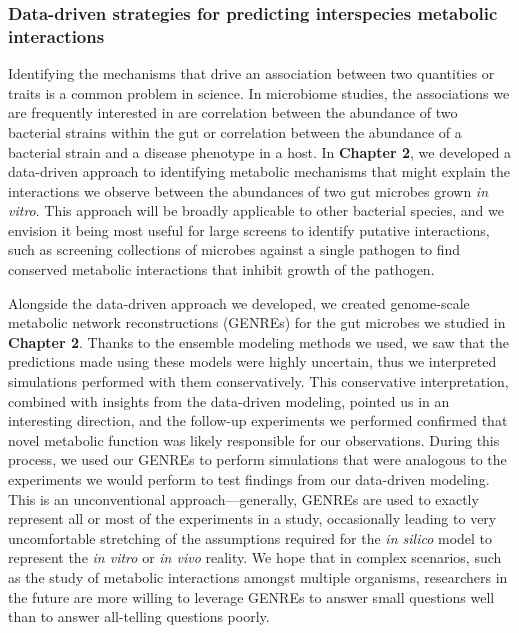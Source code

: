 \documentclass[11pt,twocolumn,notitlepage,openany,twoside]{book}
\begin{document}
\begin{refsection}
\subsubsection{Data-driven strategies for predicting interspecies metabolic interactions}

Identifying the mechanisms that drive an association between two quantities or traits is a common problem in science. In microbiome studies, the associations we are frequently interested in are correlation between the abundance of two bacterial strains within the gut or correlation between the abundance of a bacterial strain and a disease phenotype in a host. In \textbf{Chapter 2}, we developed a data-driven approach to identifying metabolic mechanisms that might explain the interactions we observe between the abundances of two gut microbes grown \textit{in vitro}. This approach will be broadly applicable to other bacterial species, and we envision it being most useful for large screens to identify putative interactions, such as screening collections of microbes against a single pathogen to find conserved metabolic interactions that inhibit growth of the pathogen.

Alongside the data-driven approach we developed, we created genome-scale metabolic network reconstructions (GENREs) for the gut microbes we studied in \textbf{Chapter 2}. Thanks to the ensemble modeling methods we used, we saw that the predictions made using these models were highly uncertain, thus we interpreted simulations performed with them conservatively. This conservative interpretation, combined with insights from the data-driven modeling, pointed us in an interesting direction, and the follow-up experiments we performed confirmed that novel metabolic function was likely responsible for our observations. During this process, we used our GENREs to perform simulations that were analogous to the experiments we would perform to test findings from our data-driven modeling. This is an unconventional approach---generally, GENREs are used to exactly represent all or most of the experiments in a study, occasionally leading to very uncomfortable stretching of the assumptions required for the \textit{in silico} model to represent the \textit{in vitro} or \textit{in vivo} reality. We hope that in complex scenarios, such as the study of metabolic interactions amongst multiple organisms, researchers in the future are more willing to leverage GENREs to answer small questions well than to answer all-telling questions poorly.


\end{refsection}
\end{document}
